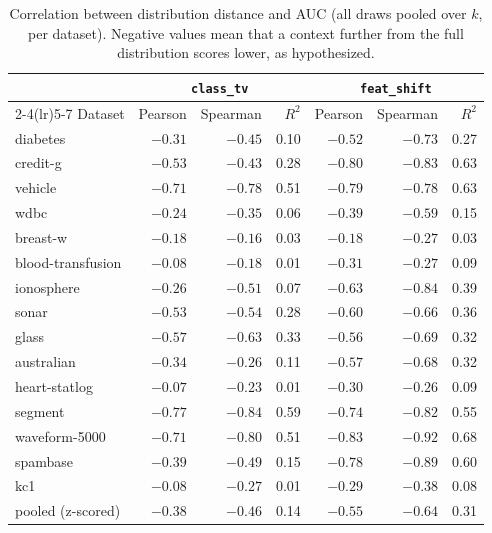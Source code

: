 \documentclass[11pt,a4paper]{article}
\begin{document}
\begin{table}[h]
\centering
\caption{Correlation between distribution distance and AUC (all draws pooled
over $k$, per dataset). Negative values mean that a context further from the
full distribution scores lower, as hypothesized.}
\label{tab:repr}
\begin{tabular}{lrrrrrr}
\toprule
& \multicolumn{3}{c}{\texttt{class\_tv}} & \multicolumn{3}{c}{\texttt{feat\_shift}} \\
\cmidrule(lr){2-4}\cmidrule(lr){5-7}
Dataset & Pearson & Spearman & $R^2$ & Pearson & Spearman & $R^2$ \\
\midrule
diabetes           & $-0.31$ & $-0.45$ & 0.10 & $-0.52$ & $-0.73$ & 0.27 \\
credit-g           & $-0.53$ & $-0.43$ & 0.28 & $-0.80$ & $-0.83$ & 0.63 \\
vehicle            & $-0.71$ & $-0.78$ & 0.51 & $-0.79$ & $-0.78$ & 0.63 \\
wdbc               & $-0.24$ & $-0.35$ & 0.06 & $-0.39$ & $-0.59$ & 0.15 \\
breast-w           & $-0.18$ & $-0.16$ & 0.03 & $-0.18$ & $-0.27$ & 0.03 \\
blood-transfusion  & $-0.08$ & $-0.18$ & 0.01 & $-0.31$ & $-0.27$ & 0.09 \\
ionosphere         & $-0.26$ & $-0.51$ & 0.07 & $-0.63$ & $-0.84$ & 0.39 \\
sonar              & $-0.53$ & $-0.54$ & 0.28 & $-0.60$ & $-0.66$ & 0.36 \\
glass              & $-0.57$ & $-0.63$ & 0.33 & $-0.56$ & $-0.69$ & 0.32 \\
australian         & $-0.34$ & $-0.26$ & 0.11 & $-0.57$ & $-0.68$ & 0.32 \\
heart-statlog      & $-0.07$ & $-0.23$ & 0.01 & $-0.30$ & $-0.26$ & 0.09 \\
segment            & $-0.77$ & $-0.84$ & 0.59 & $-0.74$ & $-0.82$ & 0.55 \\
waveform-5000      & $-0.71$ & $-0.80$ & 0.51 & $-0.83$ & $-0.92$ & 0.68 \\
spambase           & $-0.39$ & $-0.49$ & 0.15 & $-0.78$ & $-0.89$ & 0.60 \\
kc1                & $-0.08$ & $-0.27$ & 0.01 & $-0.29$ & $-0.38$ & 0.08 \\
\midrule
pooled (z-scored)  & $-0.38$ & $-0.46$ & 0.14 & $-0.55$ & $-0.64$ & 0.31 \\
\bottomrule
\end{tabular}
\end{table}
\end{document}

